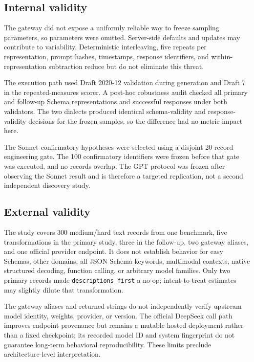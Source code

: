 \documentclass[10pt]{article}
\begin{document}
\subsection{Internal validity}
The gateway did not expose a uniformly reliable way to freeze sampling parameters, so parameters were omitted. Server-side defaults and updates may contribute to variability. Deterministic interleaving, five repeats per representation, prompt hashes, timestamps, response identifiers, and within-representation subtraction reduce but do not eliminate this threat.

The execution path used Draft 2020-12 validation during generation and Draft 7 in the repeated-measures scorer. A post-hoc robustness audit checked all primary and follow-up Schema representations and successful responses under both validators. The two dialects produced identical schema-validity and response-validity decisions for the frozen samples, so the difference had no metric impact here.

The Sonnet confirmatory hypotheses were selected using a disjoint 20-record engineering gate. The 100 confirmatory identifiers were frozen before that gate was executed, and no records overlap. The GPT protocol was frozen after observing the Sonnet result and is therefore a targeted replication, not a second independent discovery study.

\subsection{External validity}
The study covers 300 medium/hard text records from one benchmark, five transformations in the primary study, three in the follow-up, two gateway aliases, and one official provider endpoint. It does not establish behavior for easy Schemas, other domains, all JSON Schema keywords, multimodal contexts, native structured decoding, function calling, or arbitrary model families. Only two primary records made \texttt{descriptions\_first} a no-op; intent-to-treat estimates may slightly dilute that transformation.

The gateway aliases and returned strings do not independently verify upstream model identity, weights, provider, or version. The official DeepSeek call path improves endpoint provenance but remains a mutable hosted deployment rather than a fixed checkpoint; its recorded model ID and system fingerprint do not guarantee long-term behavioral reproducibility. These limits preclude architecture-level interpretation.
\end{document}
